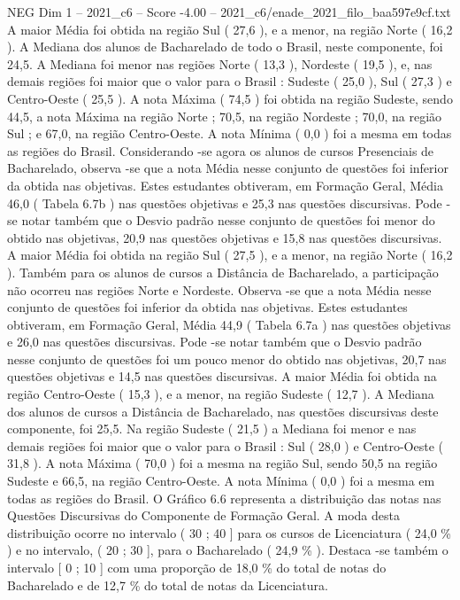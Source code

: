 \begin{textsample}{NEG Dim 1 – 2021\_c6 – Score -4.00 – 2021\_c6/enade\_2021\_filo\_baa597e9cf.txt}
A maior Média foi obtida na região Sul ( 27,6 ), e a menor, na região Norte ( 16,2 ).
A Mediana dos alunos de Bacharelado de todo o Brasil, neste componente, foi 24,5.
A Mediana foi menor nas regiões Norte ( 13,3 ), Nordeste ( 19,5 ), e, nas demais regiões foi maior que o valor para o Brasil : Sudeste ( 25,0 ), Sul ( 27,3 ) e Centro-Oeste ( 25,5 ).
A nota Máxima ( 74,5 ) foi obtida na região Sudeste, sendo 44,5, a nota Máxima na região Norte ; 70,5, na região Nordeste ; 70,0, na região Sul ; e 67,0, na região Centro-Oeste.
A nota Mínima ( 0,0 ) foi a mesma em todas as regiões do Brasil.
Considerando -se agora os alunos de cursos Presenciais de Bacharelado, observa -se que a nota Média nesse conjunto de questões foi inferior da obtida nas objetivas.
Estes estudantes obtiveram, em Formação Geral, Média 46,0 ( Tabela 6.7b ) nas questões objetivas e 25,3 nas questões discursivas.
Pode -se notar também que o Desvio padrão nesse conjunto de questões foi menor do obtido nas objetivas, 20,9 nas questões objetivas e 15,8 nas questões discursivas.
A maior Média foi obtida na região Sul ( 27,5 ), e a menor, na região Norte ( 16,2 ).
Também para os alunos de cursos a Distância de Bacharelado, a participação não ocorreu nas regiões Norte e Nordeste.
Observa -se que a nota Média nesse conjunto de questões foi inferior da obtida nas objetivas.
Estes estudantes obtiveram, em Formação Geral, Média 44,9 ( Tabela 6.7a ) nas questões objetivas e 26,0 nas questões discursivas.
Pode -se notar também que o Desvio padrão nesse conjunto de questões foi um pouco menor do obtido nas objetivas, 20,7 nas questões objetivas e 14,5 nas questões discursivas.
A maior Média foi obtida na região Centro-Oeste ( 15,3 ), e a menor, na região Sudeste ( 12,7 ).
A Mediana dos alunos de cursos a Distância de Bacharelado, nas questões discursivas deste componente, foi 25,5.
Na região Sudeste ( 21,5 ) a Mediana foi menor e nas demais regiões foi maior que o valor para o Brasil : Sul ( 28,0 ) e Centro-Oeste ( 31,8 ).
A nota Máxima ( 70,0 ) foi a mesma na região Sul, sendo 50,5 na região Sudeste e 66,5, na região Centro-Oeste.
A nota Mínima ( 0,0 ) foi a mesma em todas as regiões do Brasil.
O Gráfico 6.6 representa a distribuição das notas nas Questões Discursivas do Componente de Formação Geral.
A moda desta distribuição ocorre no intervalo ( 30 ; 40 ] para os cursos de Licenciatura ( 24,0 \% ) e no intervalo, ( 20 ; 30 ], para o Bacharelado ( 24,9 \% ).
Destaca -se também o intervalo [ 0 ; 10 ] com uma proporção de 18,0 \% do total de notas do Bacharelado e de 12,7 \% do total de notas da Licenciatura.

\end{textsample}
